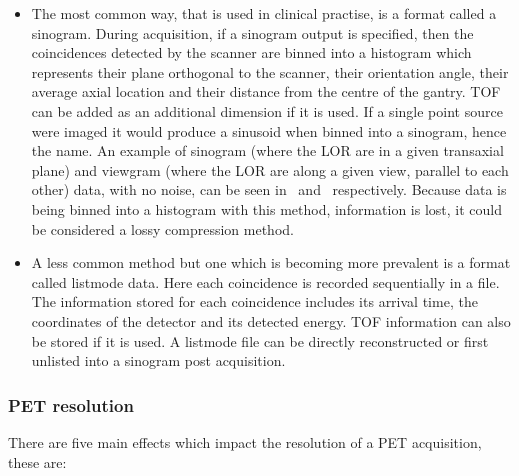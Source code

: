                \begin{itemize}
                    \item The most common way, that is used in clinical practise, is a format called a sinogram. During acquisition, if a sinogram output is specified, then the coincidences detected by the scanner are binned into a histogram which represents their plane orthogonal to the scanner, their orientation angle, their average axial location and their distance from the centre of the gantry. \gls{TOF} can be added as an additional dimension if it is used. %
                    If a single point source were imaged it would produce a sinusoid when binned into a sinogram, hence the name. An example of sinogram (where the \gls{LOR} are in a given transaxial plane) and viewgram (where the \gls{LOR} are along a given view, parallel to each other) data, with no noise, can be seen in~ and~ respectively. Because data is being binned into a histogram with this method, information is lost, it could be considered a lossy compression method.
                    
                    \item A less common method but one which is becoming more prevalent is a format called listmode data. Here each coincidence is recorded sequentially in a file. The information stored for each coincidence includes its arrival time, the coordinates of the detector and its detected energy. \gls{TOF} information can also be stored if it is used. %
                    A listmode file can be directly reconstructed or first unlisted into a sinogram post acquisition. %
                \end{itemize}
            
            \subsubsection{PET resolution} \label{sec:pet_resolution}
                There are five main effects which impact the resolution of a \gls{PET} acquisition, these are:
                
